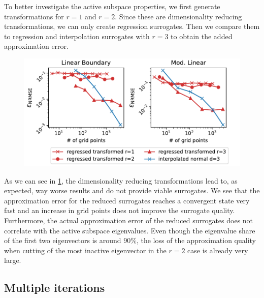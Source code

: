 \documentclass[
  a4paper,  %
  twoside,  %
  bibliography=totoc,
  headsepline,
  cleardoublepage=empty,
  parskip=half,
  draft=false
]{scrbook}
\begin{document}
To better investigate the active subspace properties, we first generate transformations for $r=1$ and $r=2$.
Since these are dimensionality reducing transformations, we can only create regression surrogates.
Then we compare them to regression and interpolation surrogates with $r=3$ to obtain the added approximation error.

\newpage
\begin{mdframed}[style=style]
\begin{figure}[H]
\includegraphics[width=\textwidth]{graphics/ishigami_red}\vspace{-2mm}
\delimit
{}
\label{fig:ishigami_red}
\end{figure}
\end{mdframed}
%
As we can see in \cref{fig:ishigami_red}, the dimensionality reducing transformations lead to, as expected, way worse results and do not provide viable surrogates.
We see that the approximation error for the reduced surrogates reaches a convergent state very fast and an increase in grid points does not improve the surrogate quality.
Furthermore, the actual approximation error of the reduced surrogates does not correlate with the active subspace eigenvalues.
Even though the eigenvalue share of the first two eigenvectors is around $90\%$, the loss of the approximation quality when cutting of the most inactive eigenvector in the $r=2$ case is already very large.

\subsection{Multiple iterations}
\end{document}
